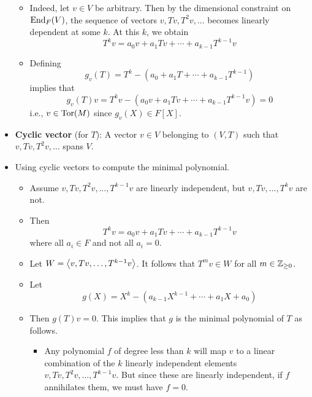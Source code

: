 \documentclass[../notes.tex]{subfiles}
\begin{document}
\begin{itemize}
\begin{itemize}
        \item Indeed, let $v\in V$ be arbitrary. Then by the dimensional constraint on $\operatorname{End}_F(V)$, the sequence of vectors $v,Tv,T^2v,\dots$ becomes linearly dependent at some $k$. At this $k$, we obtain
        \begin{equation*}
            T^kv = a_0v+a_1Tv+\cdots+a_{k-1}T^{k-1}v
        \end{equation*}
        \item Defining
        \begin{equation*}
            g_v(T) = T^k-(a_0+a_1T+\cdots+a_{k-1}T^{k-1})
        \end{equation*}
        implies that
        \begin{equation*}
            g_v(T)v = T^kv-(a_0v+a_1Tv+\cdots+a_{k-1}T^{k-1}v)
            = 0
        \end{equation*}
        i.e., $v\in\operatorname{Tor}(M)$ since $g_v(X)\in F[X]$.
    \end{itemize}
    \item \textbf{Cyclic vector} (for $T$): A vector $v\in V$ belonging to $(V,T)$ such that $v,Tv,T^2v,\dots$ spans $V$.
    \item Using cyclic vectors to compute the minimal polynomial.
    \begin{itemize}
        \item Assume $v,Tv,T^2v,\dots,T^{k-1}v$ are linearly independent, but $v,Tv,\dots,T^kv$ are not.
        \item Then
        \begin{equation*}
            T^kv = a_0v+a_1Tv+\cdots+a_{k-1}T^{k-1}v
        \end{equation*}
        where all $a_i\in F$ and not all $a_i=0$.
        \item Let $W=\left\langle{v,Tv,\dots,T^{k-1}v}\right\rangle$. It follows that $T^mv\in W$ for all $m\in{\mathbb{Z}_{\geq 0}}$.
        \item Let
        \begin{equation*}
            g(X) = X^k-(a_{k-1}X^{k-1}+\cdots+a_1X+a_0)
        \end{equation*}
        \item Then $g(T)v=0$. This implies that $g$ is the minimal polynomial of $T$ as follows.
        \begin{itemize}
            \item Any polynomial $f$ of degree less than $k$ will map $v$ to a linear combination of the $k$ linearly independent elements $v,Tv,T^2v,\dots,T^{k-1}v$. But since these are linearly independent, if $f$ annihilates them, we must have $f=0$.

\end{itemize}
\end{itemize}
\end{itemize}
\end{document}
